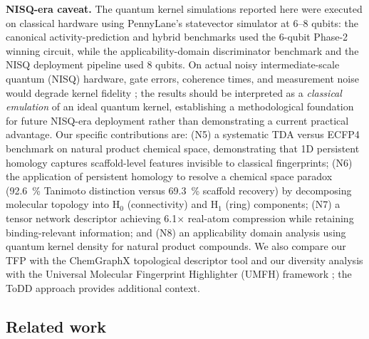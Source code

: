 \documentclass[11pt,a4paper]{article}
\begin{document}
\noindent\textbf{NISQ-era caveat.} The quantum kernel simulations reported here were executed on classical hardware using PennyLane's statevector simulator at 6--8 qubits: the canonical activity-prediction and hybrid benchmarks used the 6-qubit Phase-2 winning circuit, while the applicability-domain discriminator benchmark and the NISQ deployment pipeline used 8 qubits. On actual noisy intermediate-scale quantum (NISQ) hardware, gate errors, coherence times, and measurement noise would degrade kernel fidelity \citep{preskill2018nisq}; the results should be interpreted as a \emph{classical emulation} of an ideal quantum kernel, establishing a methodological foundation for future NISQ-era deployment rather than demonstrating a current practical advantage. Our specific contributions are: (N5) a systematic TDA versus ECFP4 benchmark on natural product chemical space, demonstrating that 1D persistent homology captures scaffold-level features invisible to classical fingerprints; (N6) the application of persistent homology to resolve a chemical space paradox (\qty{92.6}{\percent} Tanimoto distinction versus \qty{69.3}{\percent} scaffold recovery) by decomposing molecular topology into H$_0$ (connectivity) and H$_1$ (ring) components; (N7) a tensor network descriptor achieving \num{6.1}$\times$ real-atom compression while retaining binding-relevant information; and (N8) an applicability domain analysis using quantum kernel density for natural product compounds. We also compare our TFP with the ChemGraphX topological descriptor tool \citep{chemgraphx_2026} and our diversity analysis with the Universal Molecular Fingerprint Highlighter (UMFH) framework \citep{umfh_2026}; the ToDD approach \citep{todd_2023} provides additional context.

\subsection{Related work}
\end{document}
